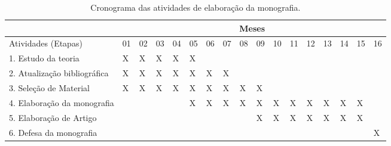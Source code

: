 \begin{table}[h]
\ABNTEXfontereduzida
\caption[Cronograma das atividades]{Cronograma das atividades de elaboração da monografia.}
\label{tab:cronograma}
\begin{minipage}{0.3\textwidth}
    \centering
\begin{tabular}{|l|l|l|l|l|l|l|l|l|l|l|l|l|l|l|l|l|}
\hline
                             & \multicolumn{16}{c|}{Meses}                                                   \\ \hline
Atividades (Etapas)          & 01 & 02 & 03 & 04 & 05 & 06 & 07 & 08 & 09 & 10 & 11 & 12 & 13 & 14 & 15 & 16 \\ \hline
1. Estudo da teoria          & X  & X  & X  & X  & X  &    &    &    &    &    &    &    &    &    &    &    \\ \hline
2. Atualização bibliográfica & X  & X  & X  & X  & X  & X  & X  &    &    &    &    &    &    &    &    &    \\ \hline
3. Seleção de Material       & X  & X  & X  & X  & X  & X  & X  & X  & X  &    &    &    &    &    &    &    \\ \hline
4. Elaboração da monografia  &    &    &    &    & X  & X  & X  & X  & X  & X  & X  & X  & X  & X  & X  &    \\ \hline
5. Elaboração de Artigo      &    &    &    &    &    &    &    &    & X  & X  & X  & X  & X  & X  & X  &    \\ \hline
6. Defesa da monografia      &    &    &    &    &    &    &    &    &    &    &    &    &    &    &    & X  \\ \hline
\end{tabular}
  \end{minipage}
\end{table}
